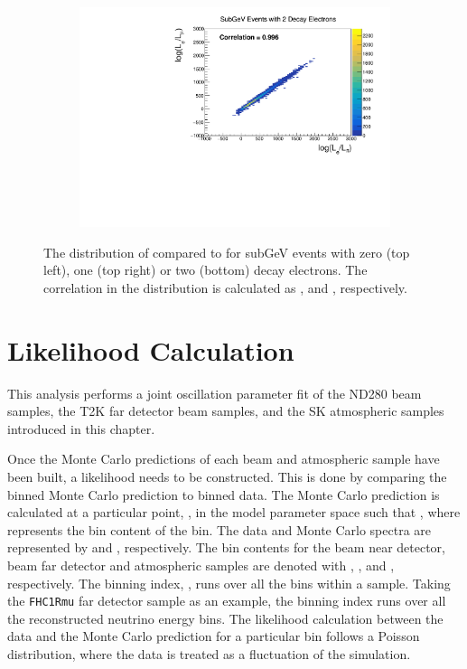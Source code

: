 \begin{figure}[h]
\begin{subfigure}[t]{0.49\textwidth}
    \includegraphics[width=\textwidth, trim={0mm 0mm 0mm 0mm}, clip,page=1]{Figures/Selections/Correlation_SG2Dcy.pdf}
  \end{subfigure}
  \caption{The distribution of  compared to  for subGeV events with zero (top left), one (top right) or two (bottom) decay electrons. The correlation in the distribution is calculated as ,  and , respectively.}
  \label{fig:SelsAndSysts_LLHCorrelation}
\end{figure}

\section{Likelihood Calculation}
\label{sec:OscillationAnalysis_LLHCalc}

This analysis performs a joint oscillation parameter fit of the ND280 beam samples, the T2K far detector beam samples, and the SK atmospheric samples introduced in this chapter. 

Once the Monte Carlo predictions of each beam and atmospheric sample have been built, a likelihood needs to be constructed. This is done by comparing the binned Monte Carlo prediction to binned data. The Monte Carlo prediction is calculated at a particular point, \quickmath{\vec{\theta}}, in the model parameter space such that , where  represents the bin content of the  bin. The data and Monte Carlo spectra are represented by  and , respectively. The bin contents for the beam near detector, beam far detector and atmospheric samples are denoted with , , and , respectively. The binning index, , runs over all the bins within a sample. Taking the \texttt{FHC1Rmu} far detector sample as an example, the binning index runs over all the reconstructed neutrino energy bins. The likelihood calculation between the data and the Monte Carlo prediction for a particular bin follows a Poisson distribution, where the data is treated as a fluctuation of the simulation. 

